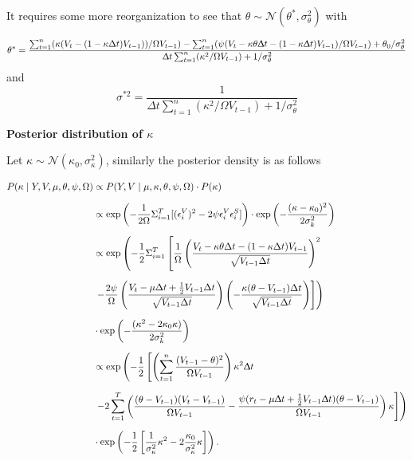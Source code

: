 \documentclass[12pt,a4paper]{article}
\numberwithin{equation}{section}
\begin{document}
It requires some more reorganization to see that $\theta \sim \mathcal{N}(\theta^*, \sigma_\theta^2)$ with

\[
\theta^* = \frac{\sum_{t=1}^n (\kappa (V_t - (1-\kappa \Delta t) V_{t-1}))/\Omega V_{t-1}) - \sum_{t=1}^n (\psi (V_t - \kappa \theta \Updelta t - (1 - \kappa \Updelta t)V_{t-1})/\Omega V_{t-1}) + \theta_0/\sigma_\theta^2}{\Updelta t \sum_{t=1}^n (\kappa^2 / \Omega V_{t-1}) + 1 / \sigma_\theta^2}
\]
and
\[
\sigma^{*2} = \frac{1}{\Delta t \sum_{t=1}^n (\kappa^2 / \Omega V_{t-1}) + 1 / \sigma_\theta^2}
\]

\textbf{Posterior distribution of $\kappa$}

Let $\kappa \sim \mathcal{N}(\kappa_0, \sigma_\kappa^2)$, similarly the posterior density is as follows

\begin{align*}
P(\kappa \mid Y, V, \mu, \theta, \psi, \Omega) & \propto P(Y, V \mid \mu, \kappa, \theta, \psi, \Omega) \cdot P(\kappa) \\[0.6em]
&\propto \exp\left(-\frac{1}{2\Omega} \Sigma_{i=1}^T [(\epsilon_i^V)^2 - 2\psi \epsilon_i^V \epsilon_i^S]\right) \cdot \exp\left(-\frac{(\kappa - \kappa_0)^2}{2\sigma_k^2}\right) \\[0.6em]
&\propto \exp\left(-\frac{1}{2} \Sigma_{i=1}^T \left[ \frac{1}{\Omega} \left( \frac{V_t - \kappa \theta \Delta t - (1 - \kappa \Delta t) V_{t-1}}{\sqrt{V_{t-1} \Delta t}} \right)^2 \right. \right. \\[0.6em]
& \left. \left.  - \frac{2\psi}{\Omega} \left( \frac{V_t - \mu \Delta t + \frac{1}{2} V_{t-1} \Delta t}{\sqrt{V_{t-1} \Delta t}} \right) \left( -\frac{\kappa (\theta - V_{t-1}) \Delta t}{\sqrt{V_{t-1} \Delta t}} \right) \right] \right) \\[0.6em]
& \cdot \exp\left(-\frac{(\kappa^2 - 2\kappa_0 \kappa)}{2\sigma_k^2}\right)\\[0.6em]
& \propto\exp\left(-\frac{1}{2} \left[\left(\sum_{t=1}^n \frac{(V_{t-1} - \theta)^2}{\Omega V_{t-1}} \right) \kappa^2 \Updelta t \right. \right. \\[0.6em] 
& \left. \left. - 2\sum_{t=1}^T \left( \frac{(\theta - V_{t-1}) (V_t - V_{t-1})}{\Omega V_{t-1}} - \frac{\psi (r_t - \mu \Updelta t + \frac{1}{2} V_{t-1} \Updelta t )(\theta - V_{t-1})}{\Omega V_{t-1}} \right) \kappa \right] \right) \\[0.6em]
& \cdot \exp\left(-\frac{1}{2} \left[\frac{1}{\sigma_\kappa^2} \kappa^2 - 2 \frac{\kappa_0}{\sigma_\kappa^2} \kappa \right] \right).
\end{align*}
\end{document}

